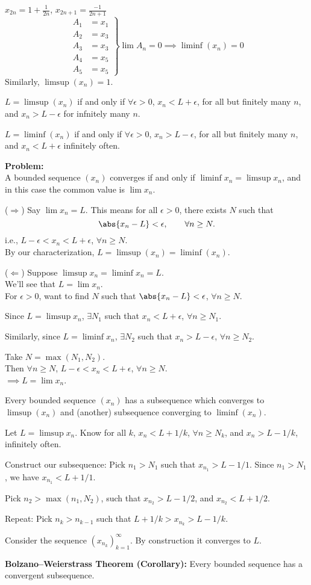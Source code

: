 \ex $x_{2n}=1+\frac{1}{2n}$, $x_{2n+1}=\frac{-1}{2n+1}$
\[ \left.
\begin{aligned}
A_1 &= x_1 \\
A_2 &= x_3 \\
A_3 &= x_3 \\
A_4 &= x_5 \\
A_5 &= x_5
\end{aligned}
\right\} \lim A_n = 0 \implies \liminf(x_n)=0
\]
Similarly, $\limsup(x_n)=1$.

\thm $L=\limsup(x_n)$ if and only if $\forall\epsilon>0$, $x_n<L+\epsilon$, for all but finitely many $n$, and $x_n>L-\epsilon$ for infnitely many $n$.

$L=\liminf(x_n)$ if and only if $\forall\epsilon>0$, $x_n>L-\epsilon$, for all but finitely many $n$, and $x_n<L+\epsilon$ infinitely often.

\textbf{Problem:} \\
\thm A bounded sequence $(x_n)$ converges if and only if $\liminf x_n=\limsup x_n$, and in this case the common value is $\lim x_n$.

\pf ($\Longrightarrow$) Say $\lim x_n=L$.  This means for all $\epsilon>0$, there exists $N$ such that
\[ \abs{x_n-L}<\epsilon, \qquad \forall n\geq N . \]
i.e., $L-\epsilon<x_n<L+\epsilon$, $\forall n\geq N$. \\
By our characterization, $L=\limsup(x_n)=\liminf(x_n)$.

($\Longleftarrow$) Suppose $\limsup x_n = \liminf x_n = L$. \\
We'll see that $L=\lim x_n$. \\
For $\epsilon>0$, want to find $N$ such that $\abs{x_n-L}<\epsilon$, $\forall n\geq N$.

Since $L=\limsup x_n$, $\exists N_1$ such that $x_n<L+\epsilon$, $\forall n\geq N_1$.

Similarly, since $L=\liminf x_n$, $\exists N_2$ such that $x_n>L-\epsilon$, $\forall n\geq N_2$.

Take $N=\max(N_1,N_2)$. \\
Then $\forall n\geq N$, $L-\epsilon<x_n<L+\epsilon$, $\forall n\geq N$. \\
$\implies L = \lim x_n$.

\prop Every bounded sequence $(x_n)$ has a subsequence which converges to $\limsup(x_n)$ and (another) subsequence converging to $\liminf(x_n)$.

\pf Let $L=\limsup x_n$.  Know for all $k$, $x_n<L+1/k$, $\forall n\geq N_k$, and $x_n>L-1/k$, infinitely often.

Construct our subsequence: Pick $n_1>N_1$ such that $x_{n_1}>L-1/1$.  Since $n_1>N_1$, we have $x_{n_1}<L+1/1$.

Pick $n_2>\max(n_1,N_2)$, such that $x_{n_2}>L-1/2$, and $x_{n_2}<L+1/2$.

Repeat: Pick $n_k>n_{k-1}$ such that $L+1/k>x_{n_k}>L-1/k$.

Consider the sequence $(x_{n_k})_{k=1}^\infty$.  By construction it converges to $L$.

\textbf{Bolzano--Weierstrass Theorem (Corollary):}  Every bounded sequence has a convergent subsequence.
